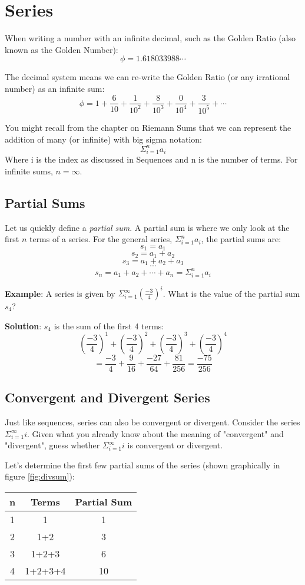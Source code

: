 \chapter{Series}
When writing a number with an infinite decimal, such as the Golden 
Ratio (also known as the Golden Number):
$$\phi = 1.618033988 \cdots$$

The decimal system means we can re-write the Golden Ratio (or any 
irrational number) as an infinite sum:
$$\phi = 1 + \frac{6}{10} + \frac{1}{10^2} + \frac{8}{10^3} + 
\frac{0}{10^4} + \frac{3}{10^5} + \cdots$$

You might recall from the chapter on Riemann Sums that we can 
represent the addition of many (or infinite) with big sigma notation:
$$\Sigma_{i = 1}^n a_i$$
Where i is the index as discussed in Sequences and n is the number of 
terms. For infinite sums, $n = \infty$.

\section{Partial Sums}
Let us quickly define a \textit{partial sum}. A partial sum is where 
we only look at the first $n$ terms of a series. For the general 
series, $\Sigma_{i=1}^{n} a_i$, the partial sums are:
$$s_1 = a_1$$
$$s_2 = a_1 + a_2$$
$$s_3 = a_1 + a_2 + a_3$$
$$\cdots$$
$$s_n = a_1 + a_2 + \cdots + a_n = \Sigma_{i=1}^{n} a_i$$

\textbf{Example}: A series is given by $\Sigma_{i=1}^\infty 
(\frac{-3}{4})^i$. What is the value of the partial sum $s_4$?

\textbf{Solution}: $s_4$ is the sum of the first 4 terms: 
$$(\frac{-3}{4})^1 + (\frac{-3}{4})^2 + (\frac{-3}{4})^3 + (\frac{-3}{4})^4$$
$$= \frac{-3}{4} + \frac{9}{16} + \frac{-27}{64} + \frac{81}{256} = \frac{-75}{256}$$


\section{Convergent and Divergent Series}
Just like sequences, series can also be convergent or divergent. 
Consider the series $\Sigma_{i=1}^\infty i$. Given what you already 
know about the meaning of "convergent" and "divergent", guess whether 
$\Sigma_{i=1}^\infty i$ is convergent or divergent. 

Let's determine the first few partial sums of the series (shown 
graphically in figure \ref{fig:divsum}):
\begin{center}
\begin{tabular}{|c|c|c|}\hline
n & Terms & Partial Sum\\
\hline
1 & 1 & 1\\
\hline
2 & 1+2 & 3\\
\hline
3 & 1+2+3 & 6\\
\hline
4 & 1+2+3+4 & 10\\
\hline
\end{tabular}
\end{center}

